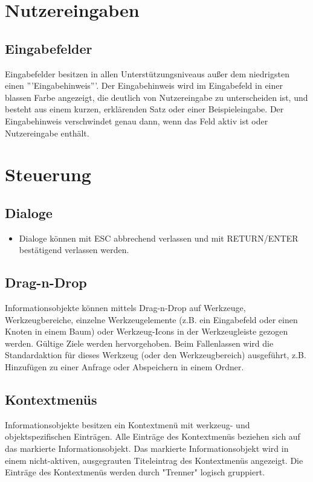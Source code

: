 \documentclass[12pt]{book}
\begin{document}
\section{Nutzereingaben}

\subsection{Eingabefelder}

Eingabefelder besitzen in allen Unterstützungsniveaus außer dem niedrigsten einen '''Eingabehinweis'''. Der Eingabehinweis wird  im Eingabefeld  in einer blassen Farbe angezeigt, die deutlich von Nutzereingabe zu unterscheiden ist, und besteht aus einem kurzen, erklärenden Satz oder einer Beispieleingabe. Der Eingabehinweis verschwindet genau dann, wenn das Feld aktiv ist oder Nutzereingabe enthält.


\section{Steuerung}

\subsection{Dialoge}

\begin{itemize}
\item Dialoge können mit ESC abbrechend verlassen und mit RETURN/ENTER bestätigend verlassen werden.
\end{itemize}



\subsection{Drag-n-Drop}

Informationsobjekte können mittels Drag-n-Drop auf Werkzeuge, Werkzeugbereiche, einzelne Werkzeugelemente (z.B. ein Eingabefeld oder einen Knoten in einem Baum) oder Werkzeug-Icons in der Werkzeugleiste gezogen werden. Gültige Ziele werden hervorgehoben. Beim Fallenlassen wird die Standardaktion für dieses Werkzeug (oder den Werkzeugbereich) ausgeführt, z.B. Hinzufügen zu einer Anfrage oder Abspeichern in einem Ordner.

\subsection{Kontextmenüs}

Informationsobjekte besitzen ein Kontextmenü mit werkzeug- und objektspezifischen Einträgen. Alle Einträge des Kontextmenüs beziehen sich auf das markierte Informationsobjekt. Das markierte Informationsobjekt wird in einem nicht-aktiven, ausgegrauten Titeleintrag des Kontextmenüs angezeigt. Die Einträge des Kontextmenüs werden durch "Trenner" logisch gruppiert.
\end{document}
